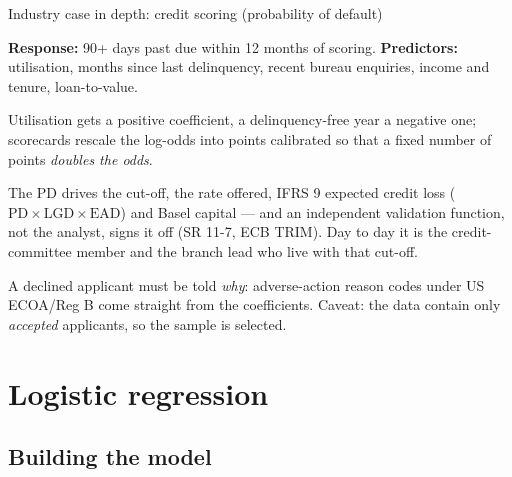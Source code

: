 \documentclass[aspectratio=169,11pt]{beamer}
\begin{document}
\begin{frame}{Industry case in depth: credit scoring (probability of default)}
  \footnotesize
  \begin{industry}
    \textbf{Response:} 90+ days past due within 12 months of scoring.\quad
    \textbf{Predictors:} utilisation, months since last delinquency, recent
    bureau enquiries, income and tenure, loan-to-value.
  \end{industry}
  \vspace{-3mm}
  \begin{numexample}
    Utilisation gets a positive coefficient, a delinquency-free year a negative
    one; scorecards rescale the log-odds into points calibrated so that a fixed
    number of points \emph{doubles the odds}.
  \end{numexample}
  \vspace{-3mm}
  \begin{readme}
    The PD drives the cut-off, the rate offered, IFRS 9 expected credit loss
    ($\text{PD}\times\text{LGD}\times\text{EAD}$) and Basel capital --- and an independent
    validation function, not the analyst, signs it off (SR 11-7, ECB TRIM).
    Day to day it is the credit-committee member and the branch lead who live
    with that cut-off.
  \end{readme}
  \vspace{-3mm}
  \begin{takeaway}
    A declined applicant must be told \emph{why}: adverse-action reason codes
    under US ECOA/Reg B come straight from the coefficients. Caveat: the data
    contain only \emph{accepted} applicants, so the sample is selected.
  \end{takeaway}
\end{frame}

\section{Logistic regression}
\subsection{Building the model}
\end{document}
